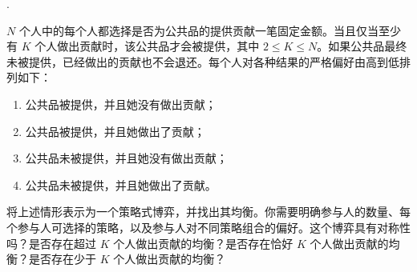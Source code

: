\begin{exercise}\label{exer:3.4}
\citep[Exercise~33.1, \textit{Contributing to a public good}]{osborne2004}.

\(N\) 个人中的每个人都选择是否为公共品的提供贡献一笔固定金额。当且仅当至少有 \(K\) 个人做出贡献时，该公共品才会被提供，其中 \(2\leq K\leq N\)。如果公共品最终未被提供，已经做出的贡献也不会退还。每个人对各种结果的严格偏好由高到低排列如下：

\begin{enumerate}
\renewcommand{\labelenumi}{(\roman{enumi})}
\setlength{\itemsep}{0.2em}

\item 公共品被提供，并且她没有做出贡献；

\item 公共品被提供，并且她做出了贡献；

\item 公共品未被提供，并且她没有做出贡献；

\item 公共品未被提供，并且她做出了贡献。

\end{enumerate}

将上述情形表示为一个策略式博弈，并找出其均衡。你需要明确参与人的数量、每个参与人可选择的策略，以及参与人对不同策略组合的偏好。这个博弈具有对称性吗？是否存在超过 \(K\) 个人做出贡献的均衡？是否存在恰好 \(K\) 个人做出贡献的均衡？是否存在少于 \(K\) 个人做出贡献的均衡？
\end{exercise}
